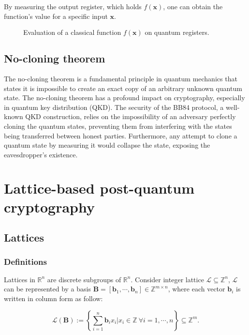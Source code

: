 \documentclass[cryptography,review,submit,pdftex,moreauthors,amsmath,amssymb,aps,strict]{Definitions/mdpi}
\newcommand{\peter}[1]{\textcolor{red}{#1}}
\begin{document}
By measuring the output register, which holds $f(\mathbf{x})$, one can obtain the function's value for a specific input $\mathbf{x}$. 
\begin{figure}[h]
    \center
    
    \caption{Evaluation of a classical function $f(\mathbf{x})$ on quantum registers.}
    \label{fig:quantum_parallelism}
\end{figure}



\subsection{No-cloning theorem}

The no-cloning theorem is a fundamental principle in quantum mechanics that states it is impossible to create an exact copy of an arbitrary unknown quantum state. The no-cloning theorem has a profound impact on cryptography, especially in quantum key distribution (QKD). The security of the BB84 protocol, a well-known QKD construction, relies on the impossibility of an adversary perfectly cloning the quantum states, preventing them from interfering with the states being transferred between honest parties. Furthermore, any attempt to clone a quantum state by measuring it would collapse the state, exposing the eavesdropper's existence.


\section{Lattice-based post-quantum cryptography} \label{post-quantum-cryptography-pqc}

\subsection{Lattices}
\subsubsection{Definitions}\label{lattice}
\begin{Definition}
    Lattices in $\mathbb{R}^n$ are discrete subgroups of $\mathbb{R}^n$. Consider integer lattice $\mathcal{L}\subseteq \mathbb{Z}^n$, $\mathcal{L}$ can be represented by a basis $\mathbf{B}=[\mathbf{b}_1,\cdots,\mathbf{b}_n]\in\mathbb{Z}^{m\times n}$, where each vector $\mathbf{b}_i$ is written in column form as follow: 

$$\mathcal{L}(\mathbf{B}):=\left\{\sum_{i=1}^n\mathbf{b}_i x_i | x_i\in\mathbb{Z}~\forall i=1,\cdots,n \right\}\subseteq\mathbb{Z}^m.$$ 
\end{Definition}
\end{document}
